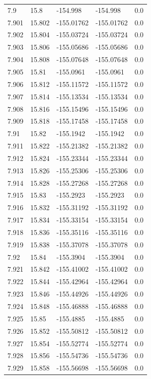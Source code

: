 \begin{tabular}{lllll}
7.9 & 15.8 & -154.998 & -154.998 & 0.0 \\
7.901 & 15.802 & -155.01762 & -155.01762 & 0.0 \\
7.902 & 15.804 & -155.03724 & -155.03724 & 0.0 \\
7.903 & 15.806 & -155.05686 & -155.05686 & 0.0 \\
7.904 & 15.808 & -155.07648 & -155.07648 & 0.0 \\
7.905 & 15.81 & -155.0961 & -155.0961 & 0.0 \\
7.906 & 15.812 & -155.11572 & -155.11572 & 0.0 \\
7.907 & 15.814 & -155.13534 & -155.13534 & 0.0 \\
7.908 & 15.816 & -155.15496 & -155.15496 & 0.0 \\
7.909 & 15.818 & -155.17458 & -155.17458 & 0.0 \\
7.91 & 15.82 & -155.1942 & -155.1942 & 0.0 \\
7.911 & 15.822 & -155.21382 & -155.21382 & 0.0 \\
7.912 & 15.824 & -155.23344 & -155.23344 & 0.0 \\
7.913 & 15.826 & -155.25306 & -155.25306 & 0.0 \\
7.914 & 15.828 & -155.27268 & -155.27268 & 0.0 \\
7.915 & 15.83 & -155.2923 & -155.2923 & 0.0 \\
7.916 & 15.832 & -155.31192 & -155.31192 & 0.0 \\
7.917 & 15.834 & -155.33154 & -155.33154 & 0.0 \\
7.918 & 15.836 & -155.35116 & -155.35116 & 0.0 \\
7.919 & 15.838 & -155.37078 & -155.37078 & 0.0 \\
7.92 & 15.84 & -155.3904 & -155.3904 & 0.0 \\
7.921 & 15.842 & -155.41002 & -155.41002 & 0.0 \\
7.922 & 15.844 & -155.42964 & -155.42964 & 0.0 \\
7.923 & 15.846 & -155.44926 & -155.44926 & 0.0 \\
7.924 & 15.848 & -155.46888 & -155.46888 & 0.0 \\
7.925 & 15.85 & -155.4885 & -155.4885 & 0.0 \\
7.926 & 15.852 & -155.50812 & -155.50812 & 0.0 \\
7.927 & 15.854 & -155.52774 & -155.52774 & 0.0 \\
7.928 & 15.856 & -155.54736 & -155.54736 & 0.0 \\
7.929 & 15.858 & -155.56698 & -155.56698 & 0.0 \\

\end{tabular}
